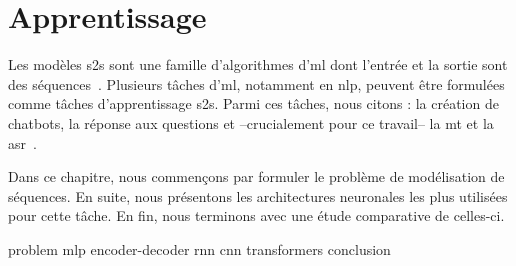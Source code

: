 \chapter{Apprentissage }

Les modèles \gls{s2s} sont une famille d'algorithmes d'\gls{ml}
dont l'entrée et la sortie sont des séquences~\cite{Martins_2018}.
Plusieurs tâches d'\gls{ml}, notamment en \gls{nlp}, 
peuvent être formulées comme tâches d'apprentissage \gls{s2s}.
Parmi ces tâches, nous citons : la création de chatbots, la réponse aux questions
et --crucialement pour ce travail-- la \gls{mt} et la \gls{asr}~\cite{Fathi_2021}.

Dans ce chapitre, nous commençons par formuler le problème de modélisation de séquences.
En suite, nous présentons les architectures neuronales les plus utilisées pour cette tâche.
En fin, nous terminons avec une étude comparative de celles-ci.

{problem}
{mlp}
{encoder-decoder}
{rnn}
{cnn}
{transformers}
{conclusion}
